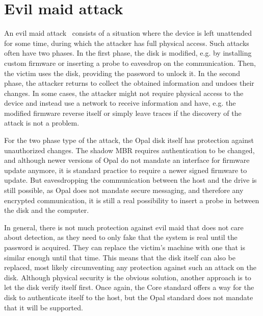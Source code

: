 

\section{Evil maid attack}

An evil maid attack~\cite{self_decrypting_risks,systematic_assessment_of_the_security} consists of a situation where the device is left unattended for some time, during which the attacker has full physical access. Such attacks often have two phases. In the first phase, the disk is modified, e.g. by installing custom firmware or inserting a probe to eavesdrop on the communication. Then, the victim uses the disk, providing the password to unlock it. In the second phase, the attacker returns to collect the obtained information and undoes their changes. In some cases, the attacker might not require physical access to the device and instead use a network to receive information and have, e.g. the modified firmware reverse itself or simply leave traces if the discovery of the attack is not a problem.

For the two phase type of the attack, the Opal disk itself has protection against unauthorized changes. The shadow MBR requires authentication to be changed, and although newer versions of Opal do not mandate an interface for firmware update anymore, it is standard practice to require a newer signed firmware to update.
But eavesdropping the communication between the host and the drive is still possible, as Opal does not mandate secure messaging, and therefore any encrypted communication, it is still a real possibility to insert a probe in between the disk and the computer.



In general, there is not much protection against evil maid that does not care about detection, as they need to only fake that the system is real until the password is acquired. They can replace the victim's machine with one that is similar enough until that time. This means that the disk itself can also be replaced, most likely circumventing any protection against such an attack on the disk.
Although physical security is the obvious solution, another approach is to let the disk verify itself first. Once again, the Core standard offers a way for the disk to authenticate itself to the host, but the Opal standard does not mandate that it will be supported.


